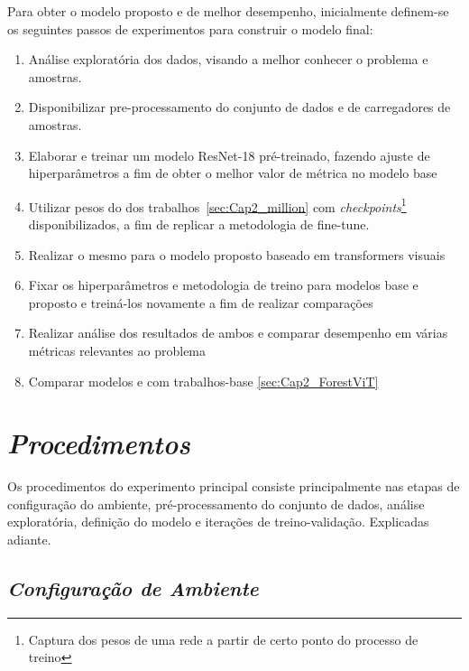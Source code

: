 Para obter o modelo proposto e de melhor desempenho, inicialmente definem-se os seguintes passos de experimentos para construir o modelo final:

\begin{enumerate}
\item   Análise exploratória dos dados, visando a melhor conhecer o problema e amostras. 
\item   Disponibilizar pre-processamento do conjunto de dados e de carregadores de amostras.
\item   Elaborar e treinar um modelo ResNet-18 pré-treinado, fazendo ajuste de hiperparâmetros a fim de obter o melhor valor de métrica no modelo base
\item   Utilizar pesos do dos trabalhos~\ref{sec:Cap2_million} com \textit{checkpoints}\footnote{Captura dos pesos de uma rede a partir de certo ponto do processo de treino} disponibilizados, a fim de replicar a metodologia de fine-tune. 
\item   Realizar o mesmo para o modelo proposto baseado em transformers visuais
\item   Fixar os hiperparâmetros e metodologia de treino para modelos base e proposto e treiná-los novamente a fim de realizar comparações
\item   Realizar análise dos resultados de ambos e comparar desempenho em várias métricas relevantes ao problema
\item   Comparar modelos e com trabalhos-base \ref{sec:Cap2_ForestViT} 
\end{enumerate}


    

\section{\textit{Procedimentos}}\label{sec:Cap3_Procedimentos}

Os procedimentos do experimento principal consiste principalmente nas etapas de configuração do ambiente, pré-processamento do conjunto de dados, análise exploratória, definição do modelo e iterações de treino-validação. Explicadas adiante.

\subsection{\textit{Configuração de Ambiente}}\label{sec:Cap3_ConfigAmbiente}

